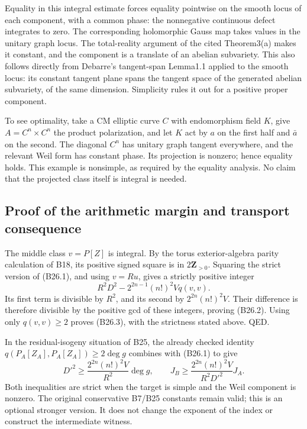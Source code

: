 Equality in this integral estimate forces equality pointwise on the smooth locus of each component, with a common phase: the nonnegative continuous defect integrates to zero. The corresponding holomorphic Gauss map takes values in the unitary graph locus. The total-reality argument of the cited Theorem3(a) makes it constant, and the component is a translate of an abelian subvariety. This also follows directly from Debarre's tangent-span Lemma1.1 applied to the smooth locus: its constant tangent plane spans the tangent space of the generated abelian subvariety, of the same dimension. Simplicity rules it out for a positive proper component.

To see optimality, take a CM elliptic curve \(C\) with endomorphism field \(K\), give \(A=C^n\times C^n\) the product polarization, and let \(K\) act by \(a\) on the first half and \(\bar a\) on the second. The diagonal \(C^n\) has unitary graph tangent everywhere, and the relevant Weil form has constant phase. Its projection is nonzero; hence equality holds. This example is nonsimple, as required by the equality analysis. No claim that the projected class itself is integral is needed.

\subsection{Proof of the arithmetic margin and transport consequence}\label{proof-of-the-arithmetic-margin-and-transport-consequence}

The middle class \(v=P[Z]\) is integral. By the torus exterior-algebra parity calculation of B18, its positive signed square is in \(2\mathbf Z_{>0}\). Squaring the strict version of (B26.1), and using \(v=Ru\), gives a strictly positive integer \[
 R^2D^2-2^{2n-1}(n!)^2Vq(v,v).
\] Its first term is divisible by \(R^2\), and its second by \(2^{2n}(n!)^2V\). Their difference is therefore divisible by the positive gcd of these integers, proving (B26.2). Using only \(q(v,v)\ge2\) proves (B26.3), with the strictness stated above. QED.

In the residual-isogeny situation of B25, the already checked identity \(q(P_A[Z_A],P_A[Z_A])\ge2\deg g\) combines with (B26.1) to give \[
 D'^2\ge\frac{2^{2n}(n!)^2V}{R^2}\deg g,
 \qquad
 J_B\ge\frac{2^{2n}(n!)^2V}{R^2D'^2}J_A.
 \tag{B26.7}
\] Both inequalities are strict when the target is simple and the Weil component is nonzero. The original conservative B7/B25 constants remain valid; this is an optional stronger version. It does not change the exponent of the index or construct the intermediate witness.

